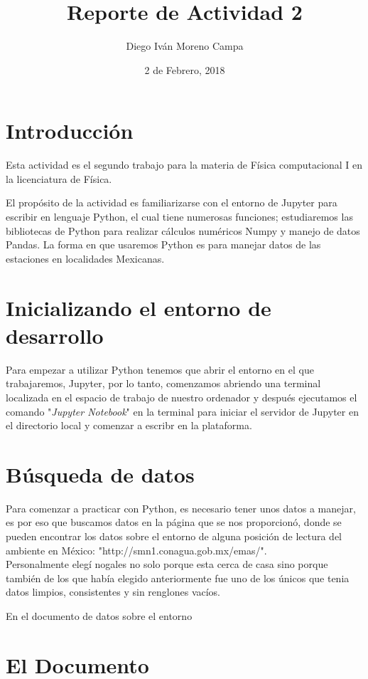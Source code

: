 \documentclass{article}
\title{Reporte de Actividad 2}
\author{Diego Iván Moreno Campa}
\date{2 de Febrero, 2018}
\begin{document}
\maketitle

\bigskip

\section{Introducción}

Esta actividad es el segundo trabajo para la materia de Física computacional I en la licenciatura de Física.

El propósito de la actividad es familiarizarse con el entorno de Jupyter para escribir en lenguaje Python, el cual tiene numerosas funciones; estudiaremos las bibliotecas de Python para realizar cálculos numéricos Numpy y manejo de datos Pandas. La forma en que usaremos Python es para manejar datos de las estaciones en localidades Mexicanas.

\section{Inicializando el entorno de desarrollo}

Para empezar a utilizar Python tenemos que abrir el entorno en el que trabajaremos, Jupyter, por lo tanto, comenzamos abriendo una terminal localizada en el espacio de trabajo de nuestro ordenador y después ejecutamos el comando "\textit{Jupyter Notebook}" en la terminal para iniciar el servidor de Jupyter en el directorio local y comenzar a escribr en la plataforma.

\section{Búsqueda de datos}

Para comenzar a practicar con Python, es necesario tener unos datos a manejar, es por eso que buscamos datos en la página que se nos proporcionó, donde se pueden encontrar los datos sobre el entorno de alguna posición de lectura del ambiente en México: "http://smn1.conagua.gob.mx/emas/". ~\\
\indent Personalmente elegí nogales no solo porque esta cerca de casa sino porque también de los que había elegido anteriormente fue uno de los únicos que tenia datos limpios, consistentes y sin renglones vacíos.

En el documento de datos sobre el entorno 

\section{El Documento}
\end{document}
